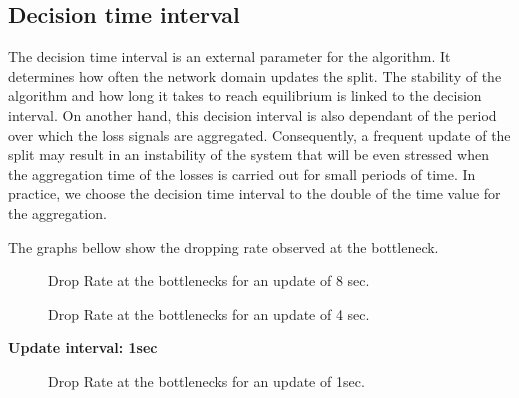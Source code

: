 \clearpage
\subsection{Decision time interval}

The decision time interval is an external parameter for the algorithm. It determines how often the network domain updates the split. The stability of the algorithm and how long it takes to reach equilibrium is linked to the decision interval. On another hand, this decision interval is also dependant of the period over which the loss signals are aggregated. Consequently, a frequent update of the split may result in an instability of the system that will be even stressed when the aggregation time of the losses is carried out for small periods of time. In practice, we choose the decision time interval to the double of the time value for the aggregation.

The graphs bellow show the dropping rate observed at the bottleneck. 

\begin{figure}[h]
\begin{center}

\caption{
 Drop Rate at the bottlenecks for an update  of  8 sec.
   \label{fig:split-eight}
}
\end{center}
\end{figure}

\begin{figure}[h!]
\begin{center}
\caption{
 Drop Rate at the bottlenecks for an update of 4 sec.
   \label{fig:split-time-four}
}
\end{center}
\end{figure}

\clearpage

{\bf Update interval: 1sec}

\begin{figure}[h]
\begin{center}

\caption{
 Drop Rate at the bottlenecks for an update  of 1sec.
   \label{fig:split-one}
}
\end{center}
\end{figure}

